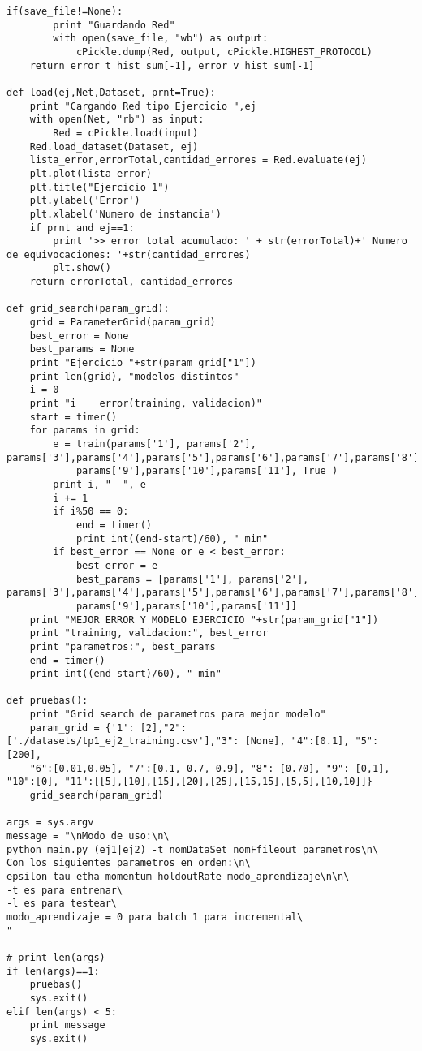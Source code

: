 \begin{lstlisting}[caption=main.py]
	if(save_file!=None):
		print "Guardando Red"
		with open(save_file, "wb") as output:
			cPickle.dump(Red, output, cPickle.HIGHEST_PROTOCOL)
	return error_t_hist_sum[-1], error_v_hist_sum[-1]

def load(ej,Net,Dataset, prnt=True):
	print "Cargando Red tipo Ejercicio ",ej
	with open(Net, "rb") as input:
		Red = cPickle.load(input)
	Red.load_dataset(Dataset, ej)
	lista_error,errorTotal,cantidad_errores = Red.evaluate(ej)
	plt.plot(lista_error)
	plt.title("Ejercicio 1")
	plt.ylabel('Error')
	plt.xlabel('Numero de instancia')
	if prnt and ej==1:
		print '>> error total acumulado: ' + str(errorTotal)+' Numero de equivocaciones: '+str(cantidad_errores)	
		plt.show()
	return errorTotal, cantidad_errores	

def grid_search(param_grid):
	grid = ParameterGrid(param_grid)
	best_error = None
	best_params = None
	print "Ejercicio "+str(param_grid["1"])
	print len(grid), "modelos distintos"
	i = 0
	print "i 	error(training, validacion)"
	start = timer()
	for params in grid:
	    e = train(params['1'], params['2'], params['3'],params['4'],params['5'],params['6'],params['7'],params['8'],
	    	params['9'],params['10'],params['11'], True )
	    print i, "	", e
	    i += 1
	    if i%50 == 0:
	    	end = timer()
	    	print int((end-start)/60), " min"
	    if best_error == None or e < best_error:
	    	best_error = e
	    	best_params = [params['1'], params['2'], params['3'],params['4'],params['5'],params['6'],params['7'],params['8'],
	    	params['9'],params['10'],params['11']]
	print "MEJOR ERROR Y MODELO EJERCICIO "+str(param_grid["1"])
	print "training, validacion:", best_error
	print "parametros:", best_params
	end = timer()
	print int((end-start)/60), " min"
	
def pruebas():
	print "Grid search de parametros para mejor modelo"	
	param_grid = {'1': [2],"2":['./datasets/tp1_ej2_training.csv'],"3": [None], "4":[0.1], "5": [200], 
	"6":[0.01,0.05], "7":[0.1, 0.7, 0.9], "8": [0.70], "9": [0,1], "10":[0], "11":[[5],[10],[15],[20],[25],[15,15],[5,5],[10,10]]}
	grid_search(param_grid)
	
args = sys.argv
message = "\nModo de uso:\n\
python main.py (ej1|ej2) -t nomDataSet nomFfileout parametros\n\
Con los siguientes parametros en orden:\n\
epsilon tau etha momentum holdoutRate modo_aprendizaje\n\n\
-t es para entrenar\
-l es para testear\
modo_aprendizaje = 0 para batch 1 para incremental\
"

# print len(args)
if len(args)==1:
	pruebas()
	sys.exit()
elif len(args) < 5:
	print message
	sys.exit()


\end{lstlisting}

